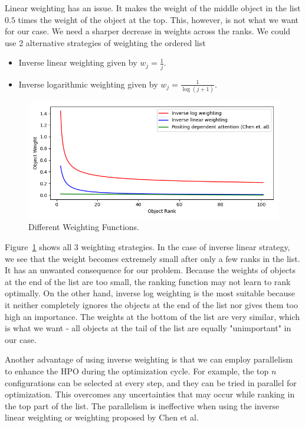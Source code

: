 \documentclass[12pt, twoside, ngerman]{report}
\begin{document}
Linear weighting has an issue. It makes the weight of the middle object in the list $0.5$ times the weight of the object at the top.
This, however, is not what we want for our case.
We need a sharper decrease in weights across the ranks.
We could use 2 alternative strategies of weighting the ordered list
\begin{itemize}
\item Inverse linear weighting given by $w_j = \frac{1}{j}$.
\item Inverse logarithmic weighting given by $w_j = \frac{1}{\log (j+1)}$.
\end{itemize}

\begin{figure}[htb]
  \centering
    \includegraphics[scale=0.65]{images/weightingfunctions}
    \caption{Different Weighting Functions.}
    \label{fig:weightingfunctions}
\end{figure}

Figure~\ref{fig:weightingfunctions} shows all 3 weighting strategies.
In the case of inverse linear strategy,  we see that the weight becomes extremely small after only a few ranks in the list.
It has an unwanted consequence for our problem.
Because the weights of objects at the end of the list are too small,  the ranking function may not learn to rank optimally.
On the other hand, inverse log weighting is the most suitable because it neither completely ignores the objects at the end of the list nor gives them too high an importance.
The weights at the bottom of the list are very similar, which is what we want - all objects at the tail of the list are equally "unimportant" in our case.

Another advantage of using inverse weighting is that we can employ parallelism to enhance the HPO during the optimization cycle.
For example, the top $n$ configurations can be selected at every step,  and they can be tried in parallel for optimization.
This overcomes any uncertainties that may occur while ranking in the top part of the list. 
The parallelism is ineffective when using the inverse linear weighting or weighting proposed by Chen et al.
\end{document}
